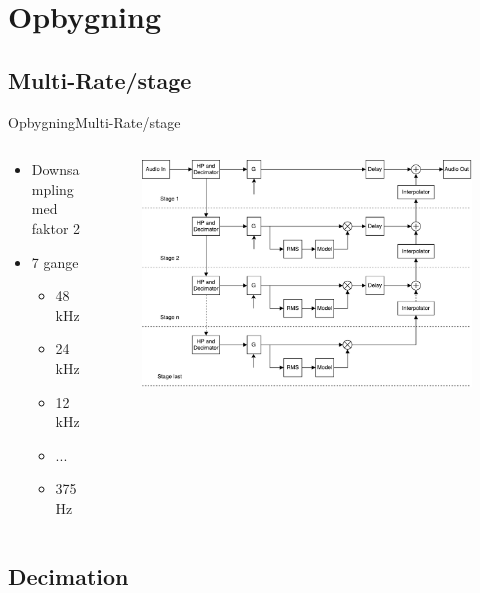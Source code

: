 
\section{Opbygning}

\subsection{Multi-Rate/stage}
\begin{frame}{Opbygning}{Multi-Rate/stage}
\begin{columns}
  \begin{column}{0.25\textwidth}
\begin{itemize}
\item Downsampling med faktor 2
\item 7 gange
\begin{itemize}
\item 48 kHz
\item 24 kHz
\item 12 kHz
\item ...
\item 375 Hz
\end{itemize}
\end{itemize}
  \end{column}
  \begin{column}{0.75\textwidth}
\begin{figure}
\includegraphics[width=\textwidth]{designRealBlock1}
\end{figure}
  \end{column}
\end{columns}
\end{frame}

\subsection{Decimation}

